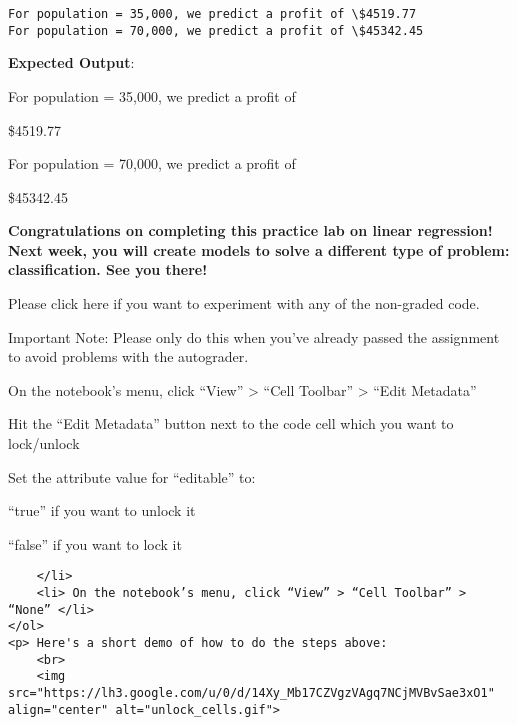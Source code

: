 \documentclass[11pt]{article}
\begin{document}
    \begin{Verbatim}[commandchars=\\\{\}]
For population = 35,000, we predict a profit of \$4519.77
For population = 70,000, we predict a profit of \$45342.45
    \end{Verbatim}

    \textbf{Expected Output}:

For population = 35,000, we predict a profit of

\$4519.77

For population = 70,000, we predict a profit of

\$45342.45

    \textbf{Congratulations on completing this practice lab on linear
regression! Next week, you will create models to solve a different type
of problem: classification. See you there!}

    Please click here if you want to experiment with any of the non-graded
code.

Important Note: Please only do this when you've already passed the
assignment to avoid problems with the autograder.

On the notebook's menu, click ``View'' \textgreater{} ``Cell Toolbar''
\textgreater{} ``Edit Metadata''

Hit the ``Edit Metadata'' button next to the code cell which you want to
lock/unlock

Set the attribute value for ``editable'' to:

``true'' if you want to unlock it

``false'' if you want to lock it

\begin{verbatim}
    </li>
    <li> On the notebook’s menu, click “View” > “Cell Toolbar” > “None” </li>
</ol>
<p> Here's a short demo of how to do the steps above: 
    <br>
    <img src="https://lh3.google.com/u/0/d/14Xy_Mb17CZVgzVAgq7NCjMVBvSae3xO1" align="center" alt="unlock_cells.gif">
\end{verbatim}


    
    
    
\end{document}
